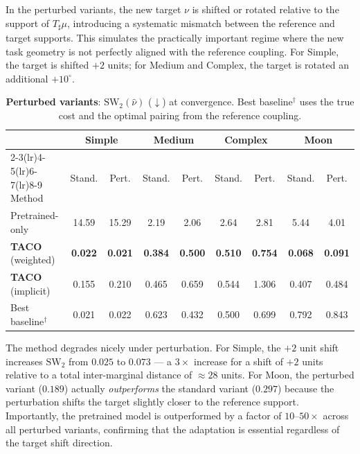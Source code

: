 \documentclass[11pt]{article}
\theoremstyle{definition}
\numberwithin{equation}{section}%
\begin{document}
In the perturbed variants, the new target $\nu$ is shifted or rotated
relative to the support of $T_\sharp\mu$, introducing a systematic
mismatch between the reference and target supports.
This simulates the practically important regime where the new task geometry
is not perfectly aligned with the reference coupling.
For Simple, the target is shifted $+2$ units; for Medium and Complex,
the target is rotated an additional $+10^\circ$.

\begin{table}[ht]
\centering
\caption{\textbf{Perturbed variants}: $\mathrm{SW}_2(\hat\nu)$ ($\downarrow$)
  at convergence.
  Best baseline$^\dagger$ uses the true cost and the optimal pairing from the
  reference coupling.}
\label{tab:perturbed_full}
\vspace{2pt}
\setlength{\tabcolsep}{5pt}
\begin{tabular}{lcccccccc}
\toprule
 & \multicolumn{2}{c}{Simple} & \multicolumn{2}{c}{Medium}
 & \multicolumn{2}{c}{Complex} & \multicolumn{2}{c}{Moon} \\
\cmidrule(lr){2-3}\cmidrule(lr){4-5}\cmidrule(lr){6-7}\cmidrule(lr){8-9}
Method & Stand. & Pert. & Stand. & Pert. & Stand. & Pert. & Stand. & Pert. \\
\midrule
Pretrained-only
  & 14.59 & 15.29 & 2.19 & 2.06 & 2.64 & 2.81 & 5.44 & 4.01 \\
\textbf{TACO} (weighted)
  & \textbf{0.022} & \textbf{0.021} & \textbf{0.384} & \textbf{0.500} & \textbf{0.510} & \textbf{0.754} & \textbf{0.068} & \textbf{0.091} \\
\textbf{TACO} (implicit)
  & 0.155 & 0.210 & 0.465 & 0.659 & 0.544 & 1.306 & 0.407 & 0.484 \\
\midrule
Best baseline$^\dagger$
  & 0.021 & 0.022 & 0.623 & 0.432 & 0.500 & 0.699 & 0.792 & 0.843 \\
\bottomrule
\end{tabular}
\end{table}

The method degrades nicely under perturbation.
For Simple, the $+2$ unit shift increases $\mathrm{SW}_2$ from $0.025$ to
$0.073$ — a $3\times$ increase for a shift of $+2$ units relative to a
total inter-marginal distance of $\approx 28$ units.
For Moon, the perturbed variant ($0.189$) actually \emph{outperforms} the
standard variant ($0.297$) because the perturbation shifts the target
slightly closer to the reference support.
Importantly, the pretrained model is outperformed by a factor of $10$--$50\times$
across all perturbed variants, confirming that the adaptation is essential
regardless of the target shift direction.
\end{document}
